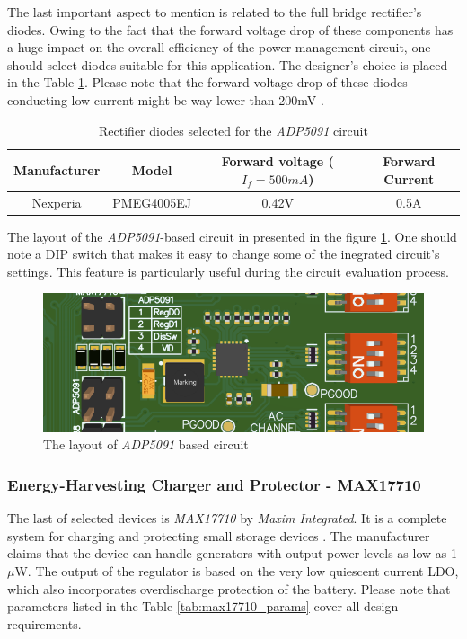 \documentclass[12pt,a4paper]{article}
\begin{document}
The last important aspect to mention is related to the full bridge rectifier's diodes. Owing to the fact that the forward voltage drop of these components has a huge impact on the overall efficiency of the power management circuit, one should select diodes suitable for this application. The designer's choice is placed in the Table \ref{tab:adp5091_diodes}. Please note that the forward voltage drop of these diodes conducting low current might be way lower than 200mV \cite{diodes_params}.
\begin{table}[ht!]
\begin{tabular}{|c|c|c|c|}
\hline
\textbf{Manufacturer} & \textbf{Model} & \textbf{Forward voltage ($I_f=500mA$)} & \textbf{Forward Current}\\ \hline
 Nexperia & PMEG4005EJ & 0.42V & 0.5A      \\ \hline

\end{tabular}
\caption{Rectifier diodes selected for the \textit{ADP5091} circuit \cite{diodes_params}}
\label{tab:adp5091_diodes}
\end{table}
\par

The layout of the \textit{ADP5091}-based circuit in presented in the figure \ref{fig:adp5091layout}. One should note a DIP switch that makes it easy to change some of the inegrated circuit's settings. This feature is particularly useful during the circuit evaluation process.
\begin{figure}[ht!]
\includegraphics[scale=0.7]{adp5091_layout.png}
\caption{The layout of \textit{ADP5091} based circuit}
\label{fig:adp5091layout}
\end{figure}
\par
\subsubsection{Energy-Harvesting Charger and Protector - MAX17710}
The last of selected devices is \textit{MAX17710} by \textit{Maxim Integrated}. It is a complete system for charging and protecting small storage devices \cite{max17710_params}. The manufacturer claims that the device can handle generators with output power levels as low as 1$\mu$W. The output of the regulator is based on the very low quiescent current LDO, which also incorporates overdischarge protection of the battery. Please note that parameters listed in the Table \ref{tab:max17710_params} cover all design requirements.
\par
\end{document}
